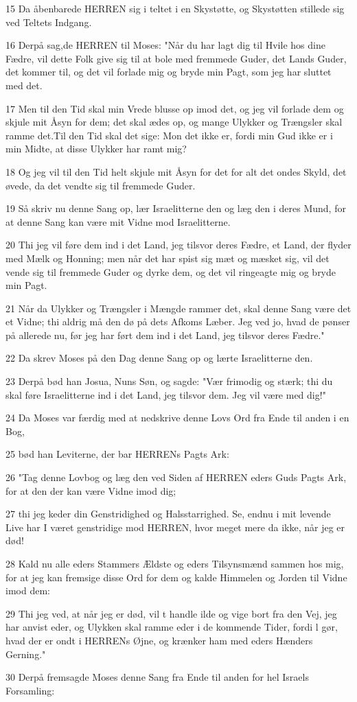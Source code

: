 \par 15 Da åbenbarede HERREN sig i teltet i en Skystøtte, og Skystøtten stillede sig ved Teltets Indgang.
\par 16 Derpå sag,de HERREN til Moses: "Når du har lagt dig til Hvile hos dine Fædre, vil dette Folk give sig til at bole med fremmede Guder, det Lands Guder, det kommer til, og det vil forlade mig og bryde min Pagt, som jeg har sluttet med det.
\par 17 Men til den Tid skal min Vrede blusse op imod det, og jeg vil forlade dem og skjule mit Åsyn for dem; det skal ædes op, og mange Ulykker og Trængsler skal ramme det.Til den Tid skal det sige: Mon det ikke er, fordi min Gud ikke er i min Midte, at disse Ulykker har ramt mig?
\par 18 Og jeg vil til den Tid helt skjule mit Åsyn for det for alt det ondes Skyld, det øvede, da det vendte sig til fremmede Guder.
\par 19 Så skriv nu denne Sang op, lær Israelitterne den og læg den i deres Mund, for at denne Sang kan være mit Vidne mod Israelitterne.
\par 20 Thi jeg vil føre dem ind i det Land, jeg tilsvor deres Fædre, et Land, der flyder med Mælk og Honning; men når det har spist sig mæt og mæsket sig, vil det vende sig til fremmede Guder og dyrke dem, og det vil ringeagte mig og bryde min Pagt.
\par 21 Når da Ulykker og Trængsler i Mængde rammer det, skal denne Sang være det et Vidne; thi aldrig må den dø på dets Afkoms Læber. Jeg ved jo, hvad de pønser på allerede nu, før jeg har ført dem ind i det Land, jeg tilsvor deres Fædre."
\par 22 Da skrev Moses på den Dag denne Sang op og lærte Israelitterne den.
\par 23 Derpå bød han Josua, Nuns Søn, og sagde: "Vær frimodig og stærk; thi du skal føre Israelitterne ind i det Land, jeg tilsvor dem. Jeg vil være med dig!"
\par 24 Da Moses var færdig med at nedskrive denne Lovs Ord fra Ende til anden i en Bog,
\par 25 bød han Leviterne, der bar HERRENs Pagts Ark:
\par 26 "Tag denne Lovbog og læg den ved Siden af HERREN eders Guds Pagts Ark, for at den der kan være Vidne imod dig;
\par 27 thi jeg keder din Genstridighed og Halsstarrighed. Se, endnu i mit levende Live har I været genstridige mod HERREN, hvor meget mere da ikke, når jeg er død!
\par 28 Kald nu alle eders Stammers Ældste og eders Tilsynsmænd sammen hos mig, for at jeg kan fremsige disse Ord for dem og kalde Himmelen og Jorden til Vidne imod dem:
\par 29 Thi jeg ved, at når jeg er død, vil t handle ilde og vige bort fra den Vej, jeg har anvist eder, og Ulykken skal ramme eder i de kommende Tider, fordi l gør, hvad der er ondt i HERRENs Øjne, og krænker ham med eders Hænders Gerning."
\par 30 Derpå fremsagde Moses denne Sang fra Ende til anden for hel Israels Forsamling:

